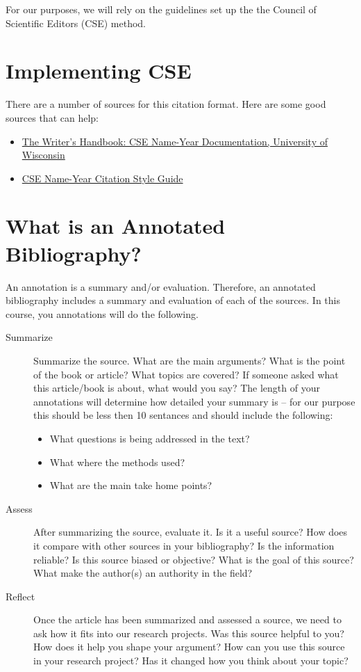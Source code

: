 \documentclass{article}\usepackage[]{graphicx}\usepackage[]{color}
\begin{document}
For our purposes, we will rely on the guidelines set up the the Council of Scientific Editors (CSE) method. 

\section{Implementing CSE}

There are a number of sources for this citation format. Here are some good sources that can help:

\begin{itemize}
  \item \href{https://writing.wisc.edu/Handbook/DocCSE_NameYear.html}{The Writer's Handbook: CSE Name-Year Documentation, University of Wisconsin}

  \item \href{https://www.mcgill.ca/library/files/library/cse-name-year-citation-style-guide.pdf}{CSE Name-Year Citation Style Guide}
\end{itemize}

\section{What is an Annotated Bibliography?}

An annotation is a summary and/or evaluation. Therefore, an annotated bibliography includes a summary and evaluation of each of the sources. In this course, you annotations will do the following.

\begin{description}
  \item[Summarize] Summarize the source. What are the main arguments? What is the point of the book or article? What topics are covered? If someone asked what this article/book is about, what would you say? The length of your annotations will determine how detailed your summary is -- for our purpose this should be less then 10 sentances and should include the following:
  
\begin{itemize}
  \item What questions is being addressed in the text?
  \item What where the methods used?
  \item What are the main take home points?  
\end{itemize}

\item[Assess] After summarizing the source, evaluate it. Is it a useful source? How does it compare with other sources in your bibliography? Is the information reliable? Is this source biased or objective? What is the goal of this source? What make the author(s) an authority in the field?

\item[Reflect] Once the article has been summarized and assessed a source, we need to ask how it fits into our research projects. Was this source helpful to you? How does it help you shape your argument? How can you use this source in your research project? Has it changed how you think about your topic? 

\end{description}
\end{document}
